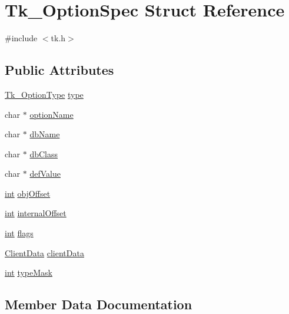 \hypertarget{struct_tk___option_spec}{}\section{Tk\+\_\+\+Option\+Spec Struct Reference}
\label{struct_tk___option_spec}


{\ttfamily \#include $<$tk.\+h$>$}

\subsection*{Public Attributes}
\begin{DoxyCompactItemize}
\item 
\hyperlink{tk_8h_a440f69c905cb5ac2c6a744380e595391}{Tk\+\_\+\+Option\+Type} \hyperlink{struct_tk___option_spec_ab061f1e0a600adc3853c2417016154b9}{type}
\item 
char $\ast$ \hyperlink{struct_tk___option_spec_a0f4f4cebd2da47c933b0dfbe835ac17f}{option\+Name}
\item 
char $\ast$ \hyperlink{struct_tk___option_spec_a5de5e24c3e05eef47e5f65e9dbc650cc}{db\+Name}
\item 
char $\ast$ \hyperlink{struct_tk___option_spec_a8f6d96b7a08f99dc77f6671f72af8b06}{db\+Class}
\item 
char $\ast$ \hyperlink{struct_tk___option_spec_a983c96fc8bf3a39e3b8df61e1b3883dd}{def\+Value}
\item 
\hyperlink{tk_8h_a83f82f76e7fed06f4c49d2db94028a6d}{int} \hyperlink{struct_tk___option_spec_a5855e59f7bbf2ec2d99adc22e846338f}{obj\+Offset}
\item 
\hyperlink{tk_8h_a83f82f76e7fed06f4c49d2db94028a6d}{int} \hyperlink{struct_tk___option_spec_a72913a7f86eabff79019bd2aed7107d6}{internal\+Offset}
\item 
\hyperlink{tk_8h_a83f82f76e7fed06f4c49d2db94028a6d}{int} \hyperlink{struct_tk___option_spec_af3c7d7f6198f6d87795424b7c37d9121}{flags}
\item 
\hyperlink{tk_8h_accf84b4d725a8f41e04d6333768a6001}{Client\+Data} \hyperlink{struct_tk___option_spec_a6ef842fb68942ff4f22e4c68d725ada3}{client\+Data}
\item 
\hyperlink{tk_8h_a83f82f76e7fed06f4c49d2db94028a6d}{int} \hyperlink{struct_tk___option_spec_a0b457348947bf8a05918905810f02ed9}{type\+Mask}
\end{DoxyCompactItemize}


\subsection{Member Data Documentation}
